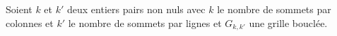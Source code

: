 Soient $k$ et $k'$ deux entiers pairs non nuls avec 
$k$ le nombre de sommets par colonnes et 
$k'$ le nombre de sommets par lignes et
$G_{k,k'}$ une grille boucl\'ee.





%
%
%
